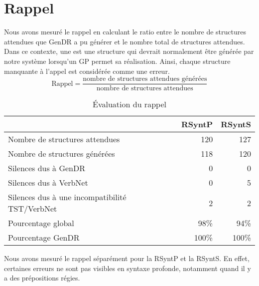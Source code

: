 \section{Rappel}
Nous avons mesuré le rappel en calculant le ratio entre le nombre de structures attendues que GenDR a pu générer et le nombre total de structures attendues. Dans ce contexte, une  est une structure qui devrait normalement être générée par notre système lorsqu'un \ac{GP} permet sa réalisation. Ainsi, chaque structure manquante à l'appel est considérée comme une erreur.
\[\text{Rappel} = \frac{\text{nombre de structures attendues générées}}{\text{nombre de structures attendues}}\]


\begin{table}
\caption{Évaluation du rappel}
\begin{tabular}{lrr}
 \toprule
   & RSyntP & RSyntS\\
 \midrule
 Nombre de structures attendues   & 120  &127  \\
 Nombre de structures générées &  118  & 120   \\
 Silences dus à GenDR & 0 & 0\\
 Silences dus à VerbNet    & 0 & 5\\
 Silences dus à une incompatibilité TST/VerbNet & 2 & 2\\
 \midrule
Pourcentage global & 98\%  & 94\% \\
Pourcentage GenDR & 100\%  & 100\% \\
\bottomrule
\end{tabular}
\end{table}

Nous avons mesuré le rappel séparément pour la RSyntP et la RSyntS. En effet, certaines erreurs ne sont pas visibles en syntaxe profonde, notamment quand il y a des prépositions régies.

